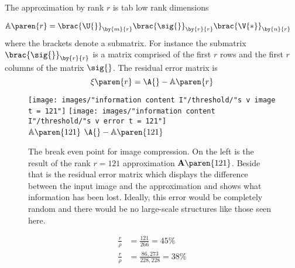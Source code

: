 The approximation by rank $r$ is 
tab low rank dimensions

\begin{equation}
  \begin{split}
    \mathbb{A}\paren{r} &= \brac{\U{}}_{\by{m}{r}} \brac{\sig{}}_{\by{r}{r}} \brac{\V{*}}_{\by{n}{r}}
  \end{split}
\end{equation}
where the brackets denote a submatrix. For instance the submatrix $\brac{\sig{}}_{\by{r}{r}}$ is a matrix comprised of the first $r$ rows and the first $r$ columns of the matrix $\sig{}$. The residual error matrix is 
\begin{equation}
  \xi\paren{r} = \A{} - \mathbb{A}\paren{r}
\end{equation}


\begin{figure}[htbp] %
   \centering
   \texttt{[image: images/"information content I"/threshold/"s v image t = 121"]} \qquad
   \texttt{[image: images/"information content I"/threshold/"s v error t = 121"]} \\
   $\mathbb{A}\paren{121}$ \quad \qquad \qquad \qquad \qquad \qquad \qquad $\A{} - \mathbb{A}\paren{121}$
   \caption[The break even point for image compression]{The break even point for image compression. On the left is the result of the rank $r=121$ approximation $\mathbf{A}\paren{121}$. Beside that is the residual error matrix which displays the difference between the input image and the approximation and shows what information has been lost. Ideally, this error would be completely random and there would be no large-scale structures like those seen here.}
   \label{fig:camille:break even}
\end{figure}

\begin{equation}
  \begin{split}
    \frac{r}{\rho} &= \frac{121}{266} = 45\% \\
    \frac{r}{\rho} &= \frac{86,273}{228,228} = 38\% \\
  \end{split}
\end{equation}
%



\endinput